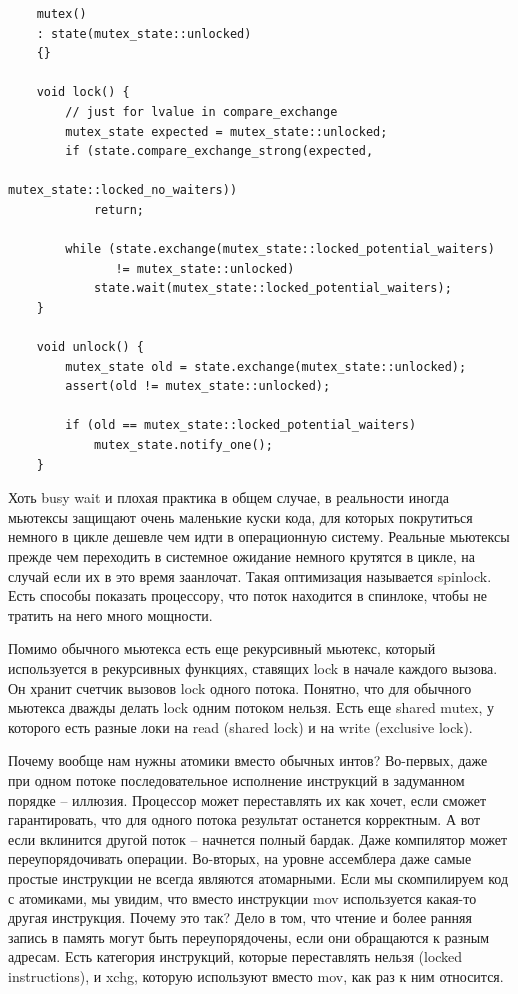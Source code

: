 \documentclass[12pt, a4paper]{article}
\begin{document}
\begin{verbatim}
	mutex()
	: state(mutex_state::unlocked)
	{}
	
	void lock() {
		// just for lvalue in compare_exchange
		mutex_state expected = mutex_state::unlocked;
		if (state.compare_exchange_strong(expected, 
		                                  mutex_state::locked_no_waiters))
			return;
		
		while (state.exchange(mutex_state::locked_potential_waiters) 
			   != mutex_state::unlocked)
			state.wait(mutex_state::locked_potential_waiters);
	}
	
	void unlock() {
		mutex_state old = state.exchange(mutex_state::unlocked);
		assert(old != mutex_state::unlocked);
		
		if (old == mutex_state::locked_potential_waiters)
			mutex_state.notify_one();
	}
\end{verbatim}
Хоть busy wait и плохая практика в общем случае, в реальности иногда мьютексы защищают очень маленькие куски кода, для которых покрутиться немного в цикле дешевле чем идти в операционную систему. Реальные мьютексы прежде чем переходить в системное ожидание немного крутятся в цикле, на случай если их в это время заанлочат. Такая оптимизация называется spinlock. Есть способы показать процессору, что поток находится в спинлоке, чтобы не тратить на него много мощности.
\par Помимо обычного мьютекса есть еще рекурсивный мьютекс, который используется в рекурсивных функциях, ставящих lock в начале каждого вызова. Он хранит счетчик вызовов lock одного потока. Понятно, что для обычного мьютекса дважды делать lock одним потоком нельзя. Есть еще shared mutex, у которого есть разные локи на read (shared lock) и на write (exclusive lock).\\
\par Почему вообще нам нужны атомики вместо обычных интов? Во-первых, даже при одном потоке последовательное исполнение инструкций в задуманном порядке -- иллюзия. Процессор может переставлять их как хочет, если сможет гарантировать, что для одного потока результат останется корректным. А вот если вклинится другой поток -- начнется полный бардак. Даже компилятор может переупорядочивать операции. Во-вторых, на уровне ассемблера даже самые простые инструкции не всегда являются атомарными. Если мы скомпилируем код с атомиками, мы увидим, что вместо инструкции mov используется какая-то другая инструкция. Почему это так? Дело в том, что чтение и более ранняя запись в память могут быть переупорядочены, если они обращаются к разным адресам. Есть категория инструкций, которые переставлять нельзя (locked instructions), и xchg, которую используют вместо mov, как раз к ним относится.
\end{document}
